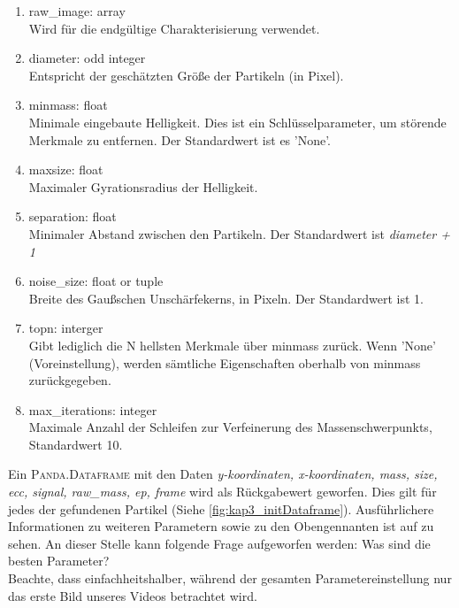 		\begin{enumerate}
    			\item raw\_image: array \\
    			Wird für die endgültige Charakterisierung verwendet.
    			\item diameter: odd integer \\
    			Entspricht der geschätzten Größe der Partikeln (in Pixel).
    			\item minmass: float \\
    			Minimale eingebaute Helligkeit. Dies ist ein Schlüsselparameter, um störende 				Merkmale zu entfernen. Der Standardwert ist es 'None'.
    			\item maxsize: float\\
    			Maximaler Gyrationsradius der Helligkeit.
    			\item separation: float\\
    			Minimaler Abstand zwischen den Partikeln. Der Standardwert ist \textit{diameter + 1}   			
    			\item noise\_size: float or tuple\\
    			Breite des Gaußschen Unschärfekerns, in Pixeln. Der Standardwert ist 1.
    			\item topn: interger\\
    			Gibt lediglich die N hellsten Merkmale über minmass zurück. Wenn 							'None' (Voreinstellung), werden sämtliche Eigenschaften oberhalb von minmass 				zurückgegeben.
    			\item max\_iterations: integer\\
    			Maximale Anzahl der Schleifen zur Verfeinerung des Massenschwerpunkts, 					Standardwert 10.
    			
		\end{enumerate}
		
Ein \textsc{Panda.Dataframe} mit den Daten \textit{y-koordinaten, x-koordinaten, mass, size, ecc, signal, raw\_mass, ep, frame} wird als Rückgabewert geworfen. Dies gilt für jedes der gefundenen Partikel (Siehe \ref{fig:kap3_initDataframe}).
Ausführlichere Informationen zu  weiteren Parametern sowie zu den Obengennanten ist auf \cite{Tp} zu sehen.%
An dieser Stelle kann folgende Frage aufgeworfen werden: Was sind die besten Parameter? \\
Beachte, dass einfachheitshalber, während der gesamten Parametereinstellung nur das erste Bild unseres Videos betrachtet wird.

